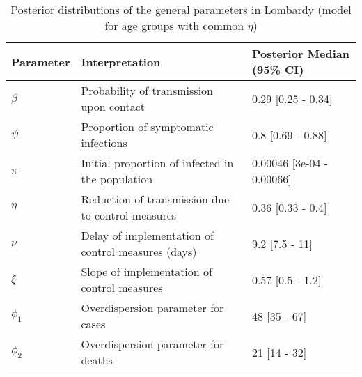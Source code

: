 \begin{table}[ht]
\centering
\begin{tabular}{lp{9cm}p{3cm}}
  \hline
Parameter & Interpretation & Posterior Median (95\% CI) \\ 
  \hline
$\beta$ & Probability of transmission upon contact & 0.29 [0.25 - 0.34] \\ 
  $\psi$ & Proportion of symptomatic infections & 0.8 [0.69 - 0.88] \\ 
  $\pi$ & Initial proportion of infected in the population & 0.00046 [3e-04 - 0.00066] \\ 
  $\eta$ & Reduction of transmission due to control measures & 0.36 [0.33 - 0.4] \\ 
  $\nu$ & Delay of implementation of control measures (days) & 9.2 [7.5 - 11] \\ 
  $\xi$ & Slope of implementation of control measures & 0.57 [0.5 - 1.2] \\ 
  $\phi_1$ & Overdispersion parameter for cases & 48 [35 - 67] \\ 
  $\phi_2$ & Overdispersion parameter for deaths & 21 [14 - 32] \\ 
   \hline
\end{tabular}
\caption{Posterior distributions of the general parameters in Lombardy (model for age groups with common $\eta$)} 
\label{tab:ParamTableLombardy_Age_CommonEta}
\end{table}
